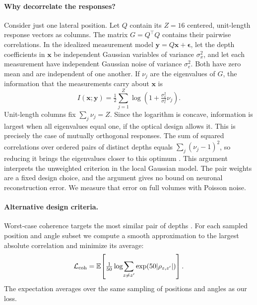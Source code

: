 \paragraph{Why decorrelate the responses?}
Consider just one lateral position. Let $Q$ contain its $Z=16$ centered, unit-length response vectors as columns. The matrix $G=Q^\top Q$ contains their pairwise correlations. In the idealized measurement model $\mathbf y=Q\mathbf x+\boldsymbol\epsilon$, let the depth coefficients in $\mathbf x$ be independent Gaussian variables of variance $\sigma_x^2$, and let each measurement have independent Gaussian noise of variance $\sigma_e^2$. Both have zero mean and are independent of one another. If $\nu_j$ are the eigenvalues of $G$, the information that the measurements carry about $\mathbf x$ is
\begin{equation}
I(\mathbf x;\mathbf y)=\tfrac12\sum_{j=1}^{Z}
\log\!\left(1+\tfrac{\sigma_x^2}{\sigma_e^2}\nu_j\right).
\end{equation}
Unit-length columns fix $\sum_j\nu_j=Z$. Since the logarithm is concave, information is largest when all eigenvalues equal one, if the optical design allows it. This is precisely the case of mutually orthogonal responses. The sum of squared correlations over ordered pairs of distinct depths equals $\sum_j(\nu_j-1)^2$, so reducing it brings the eigenvalues closer to this optimum \cite{benedetto2003,elad2007,duarte2009}. This argument interprets the unweighted criterion in the local Gaussian model. The pair weights are a fixed design choice, and the argument gives no bound on neuronal reconstruction error. We measure that error on full volumes with Poisson noise.

\paragraph{Alternative design criteria.}
Worst-case coherence targets the most similar pair of depths \cite{elad2007,duarte2009,yanny2020}. For each sampled position and angle subset we compute a smooth approximation to the largest absolute correlation and minimize its average:
\begin{equation}
\mathcal L_{\rm coh}=\mathbb E\!\left[\tfrac1{50}
\log\!\sum_{z\ne z'}\exp(50|\rho_{z,z'}|)\right].
\end{equation}
The expectation averages over the same sampling of positions and angles as our loss.

